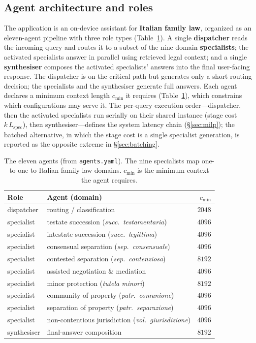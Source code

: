 \documentclass[11pt]{article}
\begin{document}
\subsection{Agent architecture and roles}
The application is an on-device assistant for \textbf{Italian family law},
organized as an eleven-agent pipeline with three role types
(Table~\ref{tab:agents}). A single \textbf{dispatcher} reads the incoming query
and routes it to a subset of the nine domain \textbf{specialists}; the activated
specialists answer in parallel using retrieved legal context; and a single
\textbf{synthesiser} composes the activated specialists' answers into the final
user-facing response. The dispatcher is on the critical path but generates only a
short routing decision; the specialists and the synthesiser generate full answers.
Each agent declares a minimum context length $c_{\min}$ it requires
(Table~\ref{tab:agents}), which constrains which configurations may serve it. The
per-query execution order---dispatcher, then the activated specialists run serially
on their shared instance (stage cost $k\,L_{\mathrm{spec}}$), then synthesiser---defines
the system latency chain (§\ref{sec:milp}); the batched alternative, in which the
stage cost is a single specialist generation, is reported as the opposite extreme in
§\ref{sec:batching}.

\begin{table}[H]
\centering
\caption{The eleven agents (from \texttt{agents.yaml}). The nine specialists map
one-to-one to Italian family-law domains. $c_{\min}$ is the minimum context the
agent requires.}
\label{tab:agents}
\small
\begin{tabular}{@{}llr@{}}
\toprule
Role & Agent (domain) & $c_{\min}$ \\
\midrule
dispatcher & routing / classification & $2048$ \\
\midrule
specialist & testate succession (\emph{succ.\ testamentaria}) & $4096$ \\
specialist & intestate succession (\emph{succ.\ legittima}) & $4096$ \\
specialist & consensual separation (\emph{sep.\ consensuale}) & $4096$ \\
specialist & contested separation (\emph{sep.\ contenziosa}) & $8192$ \\
specialist & assisted negotiation \& mediation & $4096$ \\
specialist & minor protection (\emph{tutela minori}) & $8192$ \\
specialist & community of property (\emph{patr.\ comunione}) & $4096$ \\
specialist & separation of property (\emph{patr.\ separazione}) & $4096$ \\
specialist & non-contentious jurisdiction (\emph{vol.\ giurisdizione}) & $4096$ \\
\midrule
synthesiser & final-answer composition & $8192$ \\
\bottomrule
\end{tabular}
\end{table}
\end{document}
